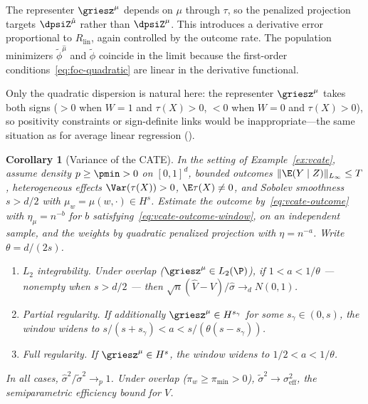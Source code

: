 \documentclass{article}
\newtheorem{corollary}[theorem]{Corollary}
\begin{document}
The representer $\griesz^\mu$
depends on $\mu$ through $\tau$,
so the penalized projection targets
$\dpsiZ^{\hat\mu}$ rather than $\dpsiZ^\mu$.
This introduces a derivative error
proportional to $R_{\mathrm{lin}}$,
again controlled by the outcome rate.
The population minimizers
$\tilde\phi^{\hat\mu}$ and $\tilde\phi$
coincide in the limit
because the first-order conditions~\eqref{eq:foc-quadratic}
are linear in the derivative functional.

Only the quadratic dispersion is natural here:
the representer $\griesz^\mu$
takes both signs
($>0$ when $W=1$ and $\tau(X) > 0$,
$<0$ when $W=0$ and $\tau(X) > 0$),
so positivity constraints
or sign-definite links would be inappropriate---the
same situation as for
average linear regression
().

\begin{corollary}[Variance of the CATE]
\label{cor:vcate}
In the setting of Example~\ref{ex:vcate},
assume density $p \ge \pmin > 0$ on $[0,1]^d$,
bounded outcomes $\|\E(Y \mid Z)\|_{L_\infty} \le T$,
heterogeneous effects $\Var(\tau(X)) > 0$,
$\E\tau(X) \ne 0$,
and Sobolev smoothness $s > d/2$
with $\mu_w = \mu(w, \cdot) \in H^s$.
Estimate the outcome by~\eqref{eq:vcate-outcome}
with $\eta_\mu = n^{-b}$
for $b$ satisfying~\eqref{eq:vcate-outcome-window},
on an independent sample,
and the weights by quadratic penalized projection
with $\eta = n^{-a}$.
Write $\theta = d/(2s)$.
\begin{enumerate}[label=\textup{(\roman*)}]
\item\label{case:vcate-structural}
\textit{$L_2$ integrability.}
Under overlap ($\griesz^\mu \in L_2(\P)$),
if $1 < a < 1/\theta$
--- nonempty when $s > d/2$ ---
then
$\sqrt{n}(\hat V - V)/\hat\sigma \to_d N(0,1)$.
\item\label{case:vcate-comparison}
\textit{Partial regularity.}
If additionally $\griesz^\mu \in H^{s_\gamma}$
for some $s_\gamma \in (0,s)$,
the window widens to
$s/(s+s_\gamma) < a < s/(\theta(s-s_\gamma))$.
\item\label{case:vcate-full}
\textit{Full regularity.}
If $\griesz^\mu \in H^s$,
the window widens to
$1/2 < a < 1/\theta$.
\end{enumerate}
In all cases,
$\hat\sigma^2 / \tilde\sigma^2 \to_p 1$.
Under overlap
($\pi_w \ge \pi_{\min} > 0$),
$\tilde\sigma^2 \to \sigma^2_{\mathrm{eff}}$,
the semiparametric efficiency bound for $V$.
\end{corollary}
\end{document}
